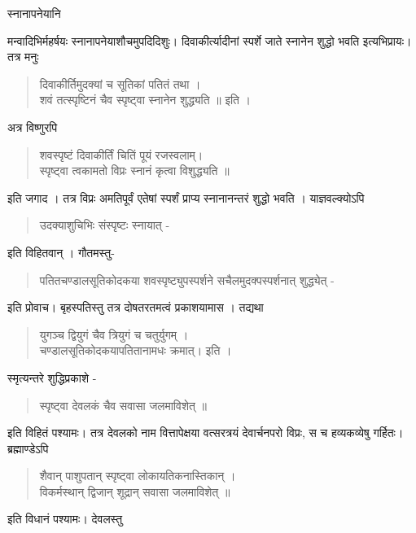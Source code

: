 {स्नानापनेयानि \

मन्वादिभिर्महर्षयः स्नानापनेयाशौचमुपदिदिशुः। दिवाकीर्त्यादीनां स्पर्शे जाते स्नानेन शुद्धो भवति इत्यभिप्रायः। तत्र मनुः 
\begin{verse}
दिवाकीर्तिमुदक्यां च सूतिकां पतितं तथा ।\\
शवं तत्स्पृष्टिनं चैव स्पृष्ट्वा स्नानेन शुद्ध्यति ॥ इति । 
\end{verse}
अत्र विष्णुरपि 
\begin{verse}
शवस्पृष्टं दिवाकीर्तिं चितिं पूयं रजस्वलाम्।\\
स्पृष्ट्वा त्वकामतो विप्रः स्नानं कृत्वा विशुद्ध्यति ॥ 
\end{verse}
इति जगाद । तत्र विप्रः अमतिपूर्वं एतेषां स्पर्शं प्राप्य स्नानानन्तरं शुद्धो भवति । याज्ञवल्क्योऽपि 
\begin{verse}
उदक्याशुचिभिः संस्पृष्टः स्नायात् -
\end{verse}
इति विहितवान् । गौतमस्तु- 
\begin{verse}
पतितचण्डालसूतिकोदकया शवस्पृष्ट्युपस्पर्शने सचैलमुदक्पस्पर्शनात्  शुद्ध्येत् -
\end{verse}
इति प्रोवाच। बृहस्पतिस्तु तत्र दोषतरतमत्वं प्रकाशयामास । तद्यथा 
\begin{verse}
युगञ्च द्वियुगं चैव त्रियुगं च चतुर्युगम् । \\
चण्डालसूतिकोदकयापतितानामधः क्रमात्। इति । 
\end{verse}
स्मृत्यन्तरे शुद्धिप्रकाशे - 
\begin{verse}
स्पृष्ट्वा देवलकं चैव सवासा जलमाविशेत् ॥
\end{verse}
इति विहितं पश्यामः। तत्र देवलको नाम वित्तापेक्षया वत्सरत्रयं देवार्चनपरो विप्रः, स च हव्यकव्येषु गर्हितः। ब्रह्माण्डेऽपि 
\begin{verse}
शैवान् पाशुपतान् स्पृष्ट्वा लोकायतिकनास्तिकान् ।\\
विकर्मस्थान् द्विजान् शूद्रान् सवासा जलमाविशेत्  ॥ 
\end{verse}

इति विधानं पश्यामः।  देवलस्तु 

}
